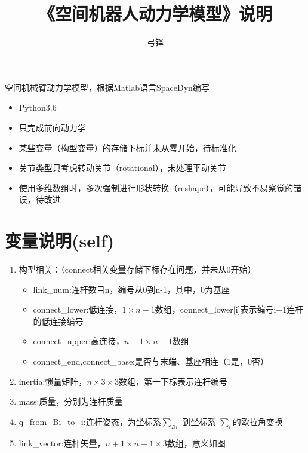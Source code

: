 \documentclass[UTF8]{ctexart}
\begin{document}
\title{《空间机器人动力学模型》说明}
\author{弓铎}
\maketitle

\noindent 空间机械臂动力学模型，根据Matlab语言SpaceDyn编写
\begin{itemize}
	\item Python3.6
	\item 只完成前向动力学
	\item 某些变量（构型变量）的存储下标并未从零开始，待标准化
	\item 关节类型只考虑转动关节（rotational），未处理平动关节
	\item 使用多维数组时，多次强制进行形状转换（reshape），可能导致不易察觉的错误，待改进
\end{itemize}

\section{变量说明(self)}

\begin{enumerate}[itemindent=0.3em]  
	\item 构型相关：（connect相关变量存储下标存在问题，并未从0开始）
	\begin{itemize}
		\item link\_num:连杆数目n，编号从0到n-1，其中，0为基座
		\item connect\_lower:低连接，$ 1 \times n-1$数组，connect\_lower[i]表示编号i+1连杆的低连接编号
		\item connect\_upper:高连接，$ n-1 \times n-1 $数组
		\item connect\_end,connect\_base:是否与末端、基座相连（1是，0否）
	
	\end{itemize}
	\item inertia:惯量矩阵，$ n \times 3 \times 3$数组，第一下标表示连杆编号
	\item mass:质量，分别为连杆质量
	\item q\_from\_Bi\_to\_i:连杆姿态，为坐标系$\sum_{Bi}$ 到坐标系 $\sum_{i}$的欧拉角变换
	\item link\_vector:连杆矢量，$ n+1 \times n+1 \times 3$数组，意义如图
\end{enumerate}
\end{document}
